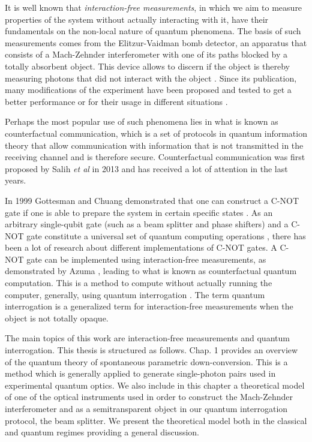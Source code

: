 \documentclass[12pt]{book}
\begin{document}
It is well known that \textit{interaction-free measurements}, in which we aim to measure properties of the system without actually interacting with it, have their fundamentals on the non-local nature of quantum phenomena. The basis of such measurements comes from the Elitzur-Vaidman bomb detector, an apparatus that consists of a Mach-Zehnder interferometer with one of its paths blocked by a totally absorbent object. This device allows to discern if the object is thereby measuring photons that did not interact with the object  \cite{Elitzur}. Since its publication, many modifications of the experiment have been proposed and tested to get a better performance or for their usage in different situations \cite{Azuma,exp,QI1,Azuma2018,electronic}.

Perhaps the most popular use of such phenomena lies in what is known as counterfactual communication, which is a set of protocols in quantum information theory that allow communication with information that is not transmitted in the receiving channel and is therefore secure. Counterfactual communication was first proposed by Salih \textit{et al} in 2013 \cite{CComunication} and has received a lot of attention in the last years.

In 1999 Gottesman and Chuang demonstrated that one can construct a C-NOT gate if one is able to prepare the system in certain specific states \cite{Gottesman}. As an arbitrary single-qubit gate (such as a beam splitter and phase shifters) and a C-NOT gate constitute a universal set of quantum computing operations \cite{chuang}, there has been a lot of research about different implementations of C-NOT gates. A C-NOT gate can be implemented using interaction-free measurements, as demonstrated by Azuma \cite{AzumaComputation}, leading to what is known as counterfactual quantum computation. This is a method to compute without actually running the computer, generally, using quantum interrogation \cite{Hosten}. The term quantum interrogation is a generalized term for interaction-free measurements when the object is not totally opaque.


\thispagestyle{plain}


The main topics of this work are interaction-free measurements and quantum interrogation. This thesis is structured as follows. Chap. 1 provides an overview of the quantum theory of spontaneous parametric down-conversion. This is a method which is generally applied to generate single-photon pairs used in experimental quantum optics. We also include in this chapter a theoretical model of one of the optical instruments used in order to construct the Mach-Zehnder interferometer and as a semitransparent object in our quantum interrogation protocol, the beam splitter. We present the theoretical model both in the classical and quantum regimes providing a general discussion.
\end{document}
